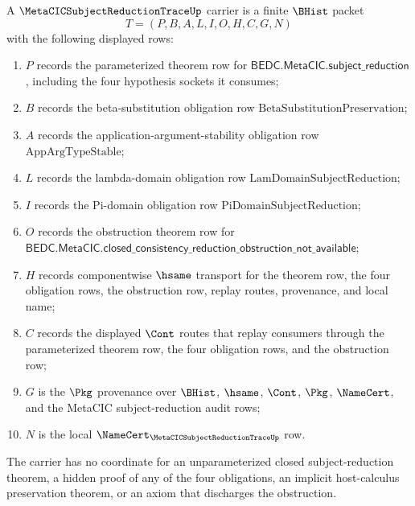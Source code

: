 \begin{definition}
\label{def:metacic-subject-reduction-trace-carrier}
A $\MetaCICSubjectReductionTraceUp$ carrier is a finite $\BHist$ packet
$$
T=(P,B,A,L,I,O,H,C,G,N)
$$
with the following displayed rows:
\begin{enumerate}
\item $P$ records the parameterized theorem row for $\mathsf{BEDC.MetaCIC.subject\_reduction}$, including the four hypothesis sockets it consumes;
\item $B$ records the beta-substitution obligation row $\mathrm{BetaSubstitutionPreservation}$;
\item $A$ records the application-argument-stability obligation row $\mathrm{AppArgTypeStable}$;
\item $L$ records the lambda-domain obligation row $\mathrm{LamDomainSubjectReduction}$;
\item $I$ records the Pi-domain obligation row $\mathrm{PiDomainSubjectReduction}$;
\item $O$ records the obstruction theorem row for $\mathsf{BEDC.MetaCIC.closed\_consistency\_reduction\_obstruction\_not\_available}$;
\item $H$ records componentwise $\hsame$ transport for the theorem row, the four obligation rows, the obstruction row, replay routes, provenance, and local name;
\item $C$ records the displayed $\Cont$ routes that replay consumers through the parameterized theorem row, the four obligation rows, and the obstruction row;
\item $G$ is the $\Pkg$ provenance over $\BHist$, $\hsame$, $\Cont$, $\Pkg$, $\NameCert$, and the MetaCIC subject-reduction audit rows;
\item $N$ is the local $\NameCert_{\MetaCICSubjectReductionTraceUp}$ row.
\end{enumerate}
The carrier has no coordinate for an unparameterized closed subject-reduction theorem, a hidden proof of any of the four obligations, an implicit host-calculus preservation theorem, or an axiom that discharges the obstruction.
\end{definition}

